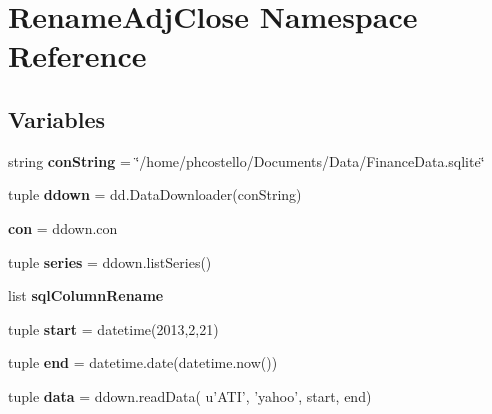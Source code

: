 \hypertarget{namespaceRenameAdjClose}{\section{\-Rename\-Adj\-Close \-Namespace \-Reference}
\label{namespaceRenameAdjClose}
}
\subsection*{\-Variables}
\begin{DoxyCompactItemize}
\item 
\hypertarget{namespaceRenameAdjClose_a7f5990cf9f338e6fc26d91e17a7662d7}{string {\bfseries con\-String} = \char`\"{}/home/phcostello/\-Documents/\-Data/\-Finance\-Data.\-sqlite\char`\"{}}\label{namespaceRenameAdjClose_a7f5990cf9f338e6fc26d91e17a7662d7}

\item 
\hypertarget{namespaceRenameAdjClose_a37dd2be426b1b0527e0bb6fb3eea805d}{tuple {\bfseries ddown} = dd.\-Data\-Downloader(con\-String)}\label{namespaceRenameAdjClose_a37dd2be426b1b0527e0bb6fb3eea805d}

\item 
\hypertarget{namespaceRenameAdjClose_aa78fcc559331108cab45f47cd8ee466c}{{\bfseries con} = ddown.\-con}\label{namespaceRenameAdjClose_aa78fcc559331108cab45f47cd8ee466c}

\item 
\hypertarget{namespaceRenameAdjClose_a62d26d4e083b2e8fb6c3759f7da6fbaf}{tuple {\bfseries series} = ddown.\-list\-Series()}\label{namespaceRenameAdjClose_a62d26d4e083b2e8fb6c3759f7da6fbaf}

\item 
list {\bfseries sql\-Column\-Rename}
\item 
\hypertarget{namespaceRenameAdjClose_a34db501b2f10ef9b22a0f0e2b797f7cb}{tuple {\bfseries start} = datetime(2013,2,21)}\label{namespaceRenameAdjClose_a34db501b2f10ef9b22a0f0e2b797f7cb}

\item 
\hypertarget{namespaceRenameAdjClose_af26985d65e00654284e69af2591e655b}{tuple {\bfseries end} = datetime.\-date(datetime.\-now())}\label{namespaceRenameAdjClose_af26985d65e00654284e69af2591e655b}

\item 
\hypertarget{namespaceRenameAdjClose_aeb49c9e2ac3dfe0bf0e6a71a7e7c638e}{tuple {\bfseries data} = ddown.\-read\-Data( u'\-A\-T\-I', 'yahoo', start, end)}\label{namespaceRenameAdjClose_aeb49c9e2ac3dfe0bf0e6a71a7e7c638e}


\end{DoxyCompactItemize}
